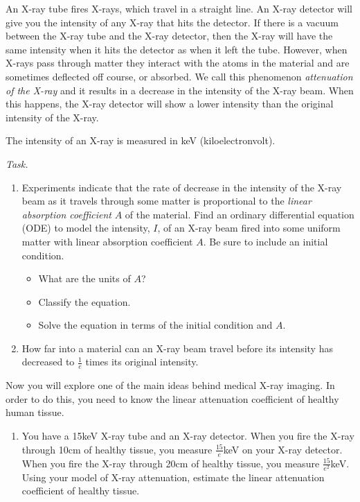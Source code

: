 An X-ray tube fires X-rays, which travel in a straight line. 
An X-ray detector will give you the intensity of any X-ray that hits the detector. 
If there is a vacuum between the X-ray tube and the X-ray detector, then the X-ray will have the same intensity when it hits the detector as when it left the tube. 
However, when X-rays pass through matter they interact with the atoms in the material and are sometimes deflected off course, or absorbed. 
We call this phenomenon \emph{attenuation of the X-ray} and it results in a decrease in the intensity of the X-ray beam. 
When this happens, the X-ray detector will show a lower intensity than the original intensity of the X-ray.

The intensity of an X-ray is measured in keV (kiloelectronvolt).

\vfill

\emph{Task.}

\begin{enumerate}[label=\emph{\arabic*.}]
\item Experiments indicate that the rate of decrease in the intensity of the X-ray beam as it travels through some matter is proportional to the \emph{linear absorption coefficient} $A$ of the material. Find an ordinary differential equation (ODE) to model the intensity, $I$, of an X-ray beam fired into some uniform matter with linear absorption coefficient $A$. Be sure to include an initial condition.
\begin{itemize}
\item What are the units of $A$?
\item Classify the equation.
\item Solve the equation in terms of the initial condition and $A$. 
\end{itemize}

\vfill

\item How far into a material can an X-ray beam travel before its intensity has decreased to $\displaystyle \frac{1}{e}$ times its original intensity.
\end{enumerate}

\vfill

Now you will explore one of the main ideas behind medical X-ray imaging. In order to do this, you need to know the linear attenuation coefficient of healthy human tissue. 

\vfill

\begin{enumerate}[resume,label=\emph{\arabic*.}]
\item You have a 15keV X-ray tube and an X-ray detector. When you fire the X-ray through 10cm of healthy tissue, you measure $\displaystyle \frac{15}{e}$keV on your X-ray detector. When you fire the X-ray through 20cm of healthy tissue, you measure $\displaystyle \frac{15}{e^2}$keV. Using your model of X-ray attenuation, estimate the linear attenuation coefficient of healthy tissue.
\end{enumerate}

